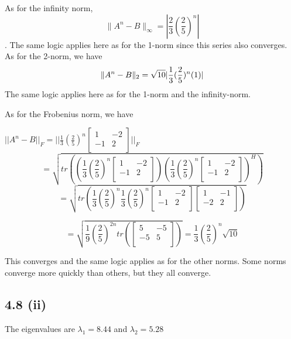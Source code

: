 \documentclass[letterpaper,12pt]{article}
\theoremstyle{definition}
\begin{document}
As for the infinity norm, \[ \|{ A^n - B}\|_{\infty} = |\frac{2}{3}(\frac{2}{5})^n | \]. The same logic applies here as for the 1-norm since this series also converges. \\ 

As for the 2-norm, we have 
\[  \|{ A^n - B}\|_2 = \sqrt{10} |{1\over3}({2\over5})^n(1)| \]
The same logic applies here as for the 1-norm and the infinity-norm.

As for the Frobenius norm, we have

 $||A^n-B||_{F} = || 
  \frac{1}{3}(\frac{2}{5})^n
  \begin{bmatrix}
   1 &  -2 \\
   -1 &  2\\
  \end{bmatrix}    ||_{F} $\\
  \[= \sqrt{ tr\left(\left(\frac{1}{3}(\frac{2}{5})^n
  \begin{bmatrix}
   1 &  -2 \\
   -1 &  2\\
  \end{bmatrix}\right)\left( \frac{1}{3}(\frac{2}{5})^n
  \begin{bmatrix}
   1 &  -2 \\
   -1 &  2\\
  \end{bmatrix}  \right)^H  \right)}\]
  \[ = \sqrt{ tr\left(\frac{1}{3}(\frac{2}{5})^n\frac{1}{3}(\frac{2}{5})^n\begin{bmatrix}
   1 &  -2 \\
   -1 &  2\\
  \end{bmatrix}\begin{bmatrix}
   1 &  -1 \\
   -2 &  2\\
  \end{bmatrix}      \right) }\]
  
  \[ = \sqrt{\frac{1}{9}\left( \frac{2}{5}  \right)^{2n}tr\left(\begin{bmatrix}
   5 &  -5 \\
   -5 &  5\\
  \end{bmatrix}\right) } = \frac{1}{3}\left(\frac{2}{5}\right)^n\sqrt{10} \]
  
  This converges and the same logic applies as for the other norms. Some norms converge more quickly than others, but they all converge.


\subsection*{4.8 (ii)}
The eigenvalues are $\lambda_1 = 8.44$ and $\lambda_2 = 5.28 $\\
\end{document}
